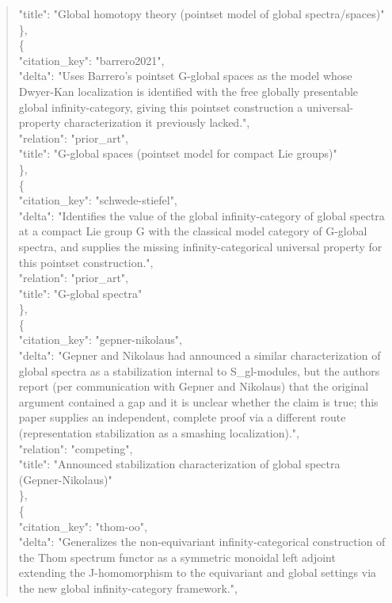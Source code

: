 \documentclass[11pt]{article}
\begin{document}
\begin{quote}
      "title": "Global homotopy theory (pointset model of global spectra/spaces)"\\
    \},\\
    \{\\
      "citation\_key": "barrero2021",\\
      "delta": "Uses Barrero's pointset G-global spaces as the model whose Dwyer-Kan localization is identified with the free globally presentable global infinity-category, giving this pointset construction a universal-property characterization it previously lacked.",\\
      "relation": "prior\_art",\\
      "title": "G-global spaces (pointset model for compact Lie groups)"\\
    \},\\
    \{\\
      "citation\_key": "schwede-stiefel",\\
      "delta": "Identifies the value of the global infinity-category of global spectra at a compact Lie group G with the classical model category of G-global spectra, and supplies the missing infinity-categorical universal property for this pointset construction.",\\
      "relation": "prior\_art",\\
      "title": "G-global spectra"\\
    \},\\
    \{\\
      "citation\_key": "gepner-nikolaus",\\
      "delta": "Gepner and Nikolaus had announced a similar characterization of global spectra as a stabilization internal to S\_gl-modules, but the authors report (per communication with Gepner and Nikolaus) that the original argument contained a gap and it is unclear whether the claim is true; this paper supplies an independent, complete proof via a different route (representation stabilization as a smashing localization).",\\
      "relation": "competing",\\
      "title": "Announced stabilization characterization of global spectra (Gepner-Nikolaus)"\\
    \},\\
    \{\\
      "citation\_key": "thom-oo",\\
      "delta": "Generalizes the non-equivariant infinity-categorical construction of the Thom spectrum functor as a symmetric monoidal left adjoint extending the J-homomorphism to the equivariant and global settings via the new global infinity-category framework.",\\

\end{quote}
\end{document}
